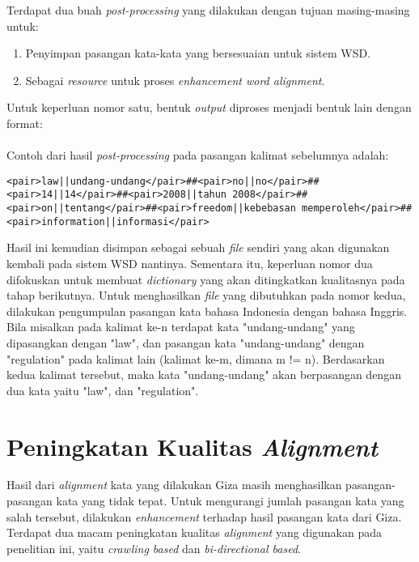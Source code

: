Terdapat dua buah \textit{post-processing} yang dilakukan dengan tujuan masing-masing untuk:

\begin{enumerate}
	\item Penyimpan pasangan kata-kata yang bersesuaian untuk sistem WSD.
	\item Sebagai \textit{resource} untuk proses \textit{enhancement word alignment}.
\end{enumerate}


Untuk keperluan nomor satu, bentuk \textit{output} diproses menjadi bentuk lain dengan format:\\

\noindent{}\\


Contoh dari hasil \textit{post-processing} pada pasangan kalimat sebelumnya adalah:

\begin{lstlisting}[backgroundcolor = \color{white}]
<pair>law||undang-undang</pair>##<pair>no||no</pair>##<pair>14||14</pair>##<pair>2008||tahun 2008</pair>##<pair>on||tentang</pair>##<pair>freedom||kebebasan memperoleh</pair>##<pair>information||informasi</pair>
\end{lstlisting}

Hasil ini kemudian disimpan sebagai sebuah \textit{file} sendiri yang akan digunakan kembali pada sistem WSD nantinya. Sementara itu, keperluan nomor dua difokuskan untuk membuat \textit{dictionary} yang akan ditingkatkan kualitasnya pada tahap berikutnya. Untuk menghasilkan \textit{file} yang dibutuhkan pada nomor kedua, dilakukan pengumpulan pasangan kata bahasa Indonesia dengan bahasa Inggris. Bila misalkan pada kalimat ke-n terdapat kata "undang-undang" yang dipasangkan dengan "law", dan pasangan kata "undang-undang" dengan "regulation" pada kalimat lain (kalimat ke-m, dimana m != n). Berdasarkan kedua kalimat tersebut, maka kata "undang-undang" akan berpasangan dengan dua kata yaitu "law", dan "regulation".

\section{Peningkatan Kualitas \textit{Alignment}}

Hasil dari \textit{alignment} kata yang dilakukan Giza masih menghasilkan pasangan-pasangan kata yang tidak tepat. Untuk mengurangi jumlah pasangan kata yang salah tersebut, dilakukan \textit{enhancement} terhadap hasil pasangan kata dari Giza. Terdapat dua macam peningkatan kualitas \textit{alignment} yang digunakan pada penelitian ini, yaitu \textit{crawling based} dan \textit{bi-directional based}.

